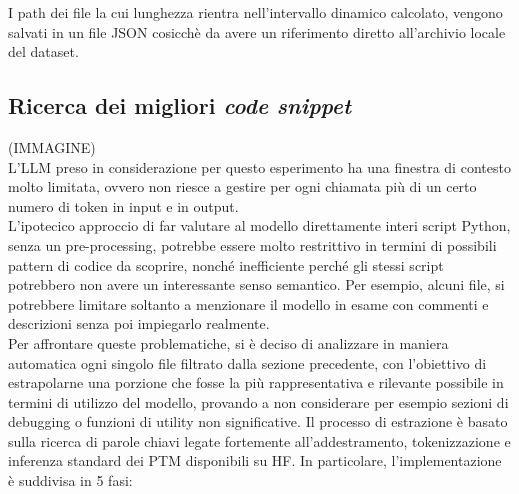 \documentclass{article}
\begin{document}
I path dei file la cui lunghezza rientra nell'intervallo dinamico calcolato, vengono salvati in un file JSON cosicchè da avere un riferimento diretto all'archivio locale del dataset.

\subsection{Ricerca dei migliori \textit{code snippet}}
(IMMAGINE)\\
L'LLM preso in considerazione per questo esperimento ha una finestra di contesto molto limitata, ovvero non riesce a gestire per ogni chiamata più di un certo numero di token in input e in output.\\
L'ipotecico approccio di far valutare al modello direttamente interi script Python, senza un pre-processing, potrebbe essere molto restrittivo in termini di possibili pattern di codice da scoprire, nonché inefficiente perché gli stessi script potrebbero non avere un interessante senso semantico. Per esempio, alcuni file, si potrebbere limitare soltanto a menzionare il modello in esame con commenti e descrizioni senza poi impiegarlo realmente.\\
Per affrontare queste problematiche, si è deciso di analizzare in maniera automatica ogni singolo file filtrato dalla sezione precedente, con l'obiettivo di estrapolarne una porzione che fosse la più rappresentativa e rilevante possibile in termini di utilizzo del modello, provando a non considerare per esempio sezioni di debugging o funzioni di utility non significative. Il processo di estrazione è basato sulla ricerca di parole chiavi legate fortemente all'addestramento, tokenizzazione e inferenza standard dei PTM disponibili su HF. In particolare, l'implementazione è suddivisa in 5 fasi:\\
\end{document}
